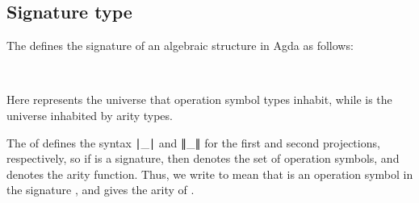 \documentclass[a4paper,USenglish,cleveref,autoref,thm-restate]{lipics-v2019}
\begin{document}
\subsection{Signature type}
The \agdaualib defines the signature of an algebraic structure in Agda as follows:
\begin{code}%
\>[0]\AgdaSpace{}%
\AgdaSymbol{:}\AgdaSpace{}%
\AgdaSymbol{(}\AgdaSpace{}%
\AgdaSpace{}%
\AgdaSymbol{:}\AgdaSpace{}%
\AgdaSymbol{)}\AgdaSpace{}%
\AgdaSpace{}%
\AgdaSpace{}%
\AgdaSpace{}%
\AgdaSpace{}%
\AgdaSpace{}%
\AgdaSpace{}%
\<%
\\
\>[0]\AgdaSpace{}%
\AgdaSpace{}%
\AgdaSpace{}%
\AgdaSymbol{=}\AgdaSpace{}%
\AgdaSpace{}%
\AgdaSpace{}%
\AgdaSpace{}%
\AgdaSpace{}%
%
\>[27]\AgdaFunction{,}\AgdaSpace{}%
\AgdaSymbol{(}\AgdaSpace{}%
\AgdaSpace{}%
\AgdaSpace{}%
\AgdaSpace{}%
\AgdaSpace{}%
\AgdaSymbol{)}\<%
\end{code}
Here  represents the universe that operation symbol types inhabit, while  is the universe inhabited by arity types.

The \preludemodule of \agdaualib defines the syntax ∣\_∣ and ∥\_∥ for the first and second projections, respectively, so if \AgdaSpace{}\AgdaSpace{}\signatureOV is a signature, then \AgdaSpace{}\AgdaSpace{} denotes the set of operation symbols, and \AgdaSpace{}\AgdaSpace{} denotes the arity function. Thus, we write \AgdaSpace{}\AgdaSpace{}\AgdaSpace{}\AgdaSpace{} to mean that  is an operation symbol in the signature , and \AgdaSpace{}\AgdaSpace{}\AgdaSpace{} gives the arity of .
\end{document}
